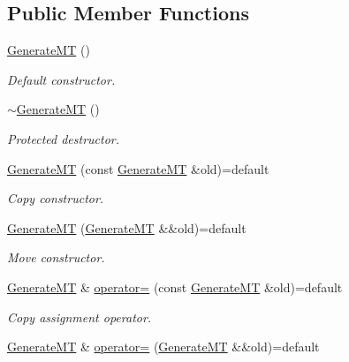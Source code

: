\subsection*{Public Member Functions}
\begin{DoxyCompactItemize}
\item 
\hyperlink{classsamp_files_1_1_generate_m_t_a733ee504a952b6d7ad997a1cd30caf45}{Generate\+MT} ()
\begin{DoxyCompactList}\small\item\em Default constructor. \end{DoxyCompactList}\item 
\mbox{\label{classsamp_files_1_1_generate_m_t_a0b2b937aa08cbbbcd9a3b8b45e26e844}} 
\hyperlink{classsamp_files_1_1_generate_m_t_a0b2b937aa08cbbbcd9a3b8b45e26e844}{$\sim$\+Generate\+MT} ()
\begin{DoxyCompactList}\small\item\em Protected destructor. \end{DoxyCompactList}\item 
\hyperlink{classsamp_files_1_1_generate_m_t_ad832487c190c46d781650416560433e5}{Generate\+MT} (const \hyperlink{classsamp_files_1_1_generate_m_t}{Generate\+MT} \&old)=default
\begin{DoxyCompactList}\small\item\em Copy constructor. \end{DoxyCompactList}\item 
\hyperlink{classsamp_files_1_1_generate_m_t_aae91db45fd9d87b0d54cd3d853a218f1}{Generate\+MT} (\hyperlink{classsamp_files_1_1_generate_m_t}{Generate\+MT} \&\&old)=default
\begin{DoxyCompactList}\small\item\em Move constructor. \end{DoxyCompactList}\item 
\hyperlink{classsamp_files_1_1_generate_m_t}{Generate\+MT} \& \hyperlink{classsamp_files_1_1_generate_m_t_a37331925c0b909adc51188af1b80995a}{operator=} (const \hyperlink{classsamp_files_1_1_generate_m_t}{Generate\+MT} \&old)=default
\begin{DoxyCompactList}\small\item\em Copy assignment operator. \end{DoxyCompactList}\item 
\hyperlink{classsamp_files_1_1_generate_m_t}{Generate\+MT} \& \hyperlink{classsamp_files_1_1_generate_m_t_a7c633b7728fcadde846a4538484d286a}{operator=} (\hyperlink{classsamp_files_1_1_generate_m_t}{Generate\+MT} \&\&old)=default

\end{DoxyCompactItemize}
